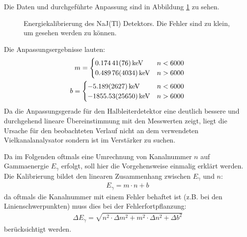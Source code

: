 \documentclass[11pt, a4paper]{article}
\numberwithin{equation}{section}
\begin{document}
Die Daten und durchgeführte Anpassung sind in Abbildung \ref{fig:kalibrierung_szinti} zu sehen.
\begin{figure}[ht]
	\centering
	
	\caption{Energiekalibrierung des NaJ(Tl) Detektors. Die Fehler sind zu klein, um gesehen werden zu können.}
	\label{fig:kalibrierung_szinti}
\end{figure}
Die Anpassungsergebnisse lauten:
\begin{align}
	m = 
	\begin{cases}
	\SI{0.17441+-0.00076}{\kilo\electronvolt} & n < 6000 \\
	\SI{0.48976+-0.04034}{\kilo\electronvolt} & n > 6000
	\end{cases}\\
	b = 
	\begin{cases}
	\SI{-5.189+-2.627}{\kilo\electronvolt} & n < 6000 \\
	\SI{-1855.53+-256.50}{\kilo\electronvolt} & n > 6000
	\end{cases}
\end{align}
Da die Anpassungsgerade für den Halbleiterdetektor eine deutlich bessere und durchgehend lineare Übereinstimmung mit den Messwerten zeigt, liegt die Ursache für den beobachteten Verlauf nicht an dem verwendeten Vielkanalanalysator sondern ist im Verstärker zu suchen.

Da im Folgenden oftmals eine Umrechnung von Kanalnummer $n$ auf Gammaenergie $E_\gamma$ erfolgt, soll hier die Vorgehensweise einmalig erklärt werden.
Die Kalibrierung bildet den linearen Zusammenhang zwischen $E_\gamma$ und $n$:
\begin{align}
	E_\gamma = m \cdot n + b
\end{align}
da oftmals die Kanalnummer mit einem Fehler behaftet ist (z.B. bei den Linienschwerpunkten) muss dies bei der Fehlerfortpflanzung:
\begin{align}
	\Delta E_\gamma = \sqrt{n^2 \cdot \Delta m^2 + m^2 \cdot \Delta n^2 + \Delta b^2}
\end{align}
berücksichtigt werden.
\end{document}
